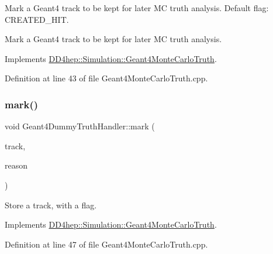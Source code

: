 Mark a Geant4 track to be kept for later MC truth analysis. Default flag\+: C\+R\+E\+A\+T\+E\+D\+\_\+\+H\+IT. 

Mark a Geant4 track to be kept for later MC truth analysis. 

Implements \hyperlink{class_d_d4hep_1_1_simulation_1_1_geant4_monte_carlo_truth_ad74253c38fb6e00003b591a07e5e748d}{D\+D4hep\+::\+Simulation\+::\+Geant4\+Monte\+Carlo\+Truth}.



Definition at line 43 of file Geant4\+Monte\+Carlo\+Truth.\+cpp.

\hypertarget{class_d_d4hep_1_1_simulation_1_1_geant4_dummy_truth_handler_aa5a1b21c7557cd4dfb314b217fc37a87}{}\label{class_d_d4hep_1_1_simulation_1_1_geant4_dummy_truth_handler_aa5a1b21c7557cd4dfb314b217fc37a87} 
\subsubsection{\texorpdfstring{mark()}{mark()}\hspace{0.1cm}{\footnotesize\ttfamily [2/4]}}
{\footnotesize\ttfamily void Geant4\+Dummy\+Truth\+Handler\+::mark (\begin{DoxyParamCaption}\item[{const G4\+Track $\ast$}]{track,  }\item[{int}]{reason }\end{DoxyParamCaption})\hspace{0.3cm}{\ttfamily [virtual]}}



Store a track, with a flag. 



Implements \hyperlink{class_d_d4hep_1_1_simulation_1_1_geant4_monte_carlo_truth_a6b63ab3d0ac424aba1088fb9ea2994dc}{D\+D4hep\+::\+Simulation\+::\+Geant4\+Monte\+Carlo\+Truth}.



Definition at line 47 of file Geant4\+Monte\+Carlo\+Truth.\+cpp.

\hypertarget{class_d_d4hep_1_1_simulation_1_1_geant4_dummy_truth_handler_a19f10fada0444ae5f60deb1d92761969}{}\label{class_d_d4hep_1_1_simulation_1_1_geant4_dummy_truth_handler_a19f10fada0444ae5f60deb1d92761969} 
